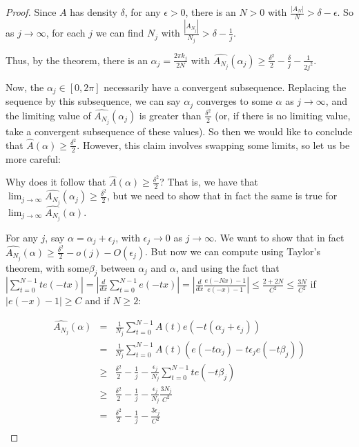 \documentclass{report}
\theoremstyle{remark}
\numberwithin{equation}{section}
\begin{document}
\begin{proof}Since $A$ has density $\delta$, for any $\epsilon > 0$,
  there is an $N > 0$ with $\frac{|A_N|}{N} > \delta-\epsilon$.  So as
  $j \to \infty$, for each $j$ we can find $N_j$ with
  $\frac{|A_{N_j}|}{N_j} > \delta-\frac{1}{j}$.

  Thus, by the theorem, there is an $\alpha_j = \frac{2\pi k_j}{2N}$
  with
  $\widehat{A_{N_j}}(\alpha_j) \geq
  \frac{\delta^2}{2}-\frac{\delta}{j} - \frac{1}{2j^2}$.

  Now, the $\alpha_j \in [0,2\pi]$ necessarily have a convergent
  subsequence.  Replacing the sequence by this subsequence, we can say
  $\alpha_j$ converges to some $\alpha$ as $j \to \infty$, and the
  limiting value of $\widehat{A_{N_j}}(\alpha_j)$ is greater than
  $\frac{\delta^2}{2}$ (or, if there is no limiting value, take a
  convergent subsequence of these values).  So then we would like to
  conclude that $\widehat{A}(\alpha) \geq \frac{\delta^2}{2}$.
  However, this claim involves swapping some limits, so let us be more
  careful:
  
  Why does it follow that
  $\widehat{A}(\alpha) \geq \frac{\delta^2}{2}$?  That is, we have
  that
  $\lim_{j \to \infty} \widehat{A_{N_j}}(\alpha_j) \geq
  \frac{\delta^2}{2}$, but we need to show that in fact the same is
  true for $\lim_{j \to \infty} \widehat{A_{N_j}}(\alpha)$.

  For any $j$, say $\alpha = \alpha_j + \epsilon_j$, with
  $\epsilon_j \to 0$ as $j \to \infty$.  We want to show that in fact
  $\widehat{A_{N_j}}(\alpha) \geq \frac{\delta^2}{2} - o(j) -
  O(\epsilon_j)$.  But now we can compute using Taylor's theorem, with
  some$\beta_j$ between $\alpha_j$ and $\alpha$, and using the fact
  that
  $\left|\sum_{t=0}^{N-1} t e(-tx)\right| =
  \left|\frac{d}{dx}\sum_{t=0}^{N-1} e(-tx)\right| =
  \left|\frac{d}{dx} \frac{e(-Nx) -1}{e(-x)-1}\right| \leq
  \frac{2+2N}{C^2} \leq \frac{3N}{C^2}$ if $|e(-x)-1| \geq C$ and if
  $N \geq 2$:

  \begin{eqnarray*}
    \widehat{A_{N_j}}(\alpha) &=& \frac{1}{N_j} \sum_{t=0}^{N-1} A(t)
                                  e(-t(\alpha_j+\epsilon_j))\\
                              &=& \frac{1}{N_j} \sum_{t=0}^{N-1} A(t)
                                  (e(-t\alpha_j)-t\epsilon_je(-t\beta_j))\\
                              &\geq& \frac{\delta^2}{2} - \frac{1}{j}
                                     - \frac{\epsilon_j}{N_j} \sum_{t=0}^{N-1}
                                     t e(-t\beta_j)\\
                              &\geq& \frac{\delta^2}{2} - \frac{1}{j}
                                     - \frac{\epsilon_j}{N_j} \frac{3N_j}{C^2}\\
                              &=& \frac{\delta^2}{2} - \frac{1}{j}
                                  - \frac{3\epsilon_j}{C^2}\\
  \end{eqnarray*}


\end{proof}
\end{document}
